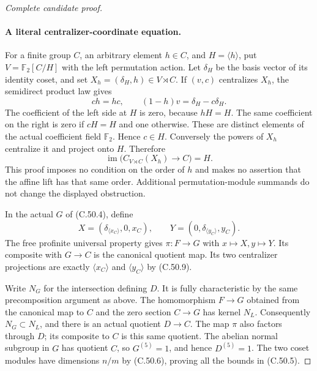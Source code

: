 \begin{proof}[Complete candidate proof]
\paragraph{A literal centralizer-coordinate equation.}
For a finite group $C$, an arbitrary element $h\in C$, and
$H=\langle h\rangle$, put $V=\mathbb F_2[C/H]$ with the
left permutation action. Let $\delta_H$ be the basis vector of
its identity coset, and set $X_h=(\delta_H,h)\in V\rtimes C$.
If $(v,c)$ centralizes $X_h$, the semidirect product law gives
\[
      ch=hc,\qquad (1-h)v=\delta_H-c\delta_H.          \tag{C.50.8}
\]
The coefficient of the left side at $H$ is zero, because $hH=H$.
The same coefficient on the right is zero if $cH=H$ and one
otherwise. These are distinct elements of the actual coefficient
field $\mathbb F_2$. Hence $c\in H$. Conversely the powers of
$X_h$ centralize it and project onto $H$. Therefore
\[
       \operatorname{im}\bigl(C_{V\rtimes C}(X_h)\to C\bigr)=H.
                                                               \tag{C.50.9}
\]
This proof imposes no condition on the order of $h$ and makes no
assertion that the affine lift has that same order. Additional
permutation-module summands do not change the displayed obstruction.

In the actual $G$ of (C.50.4), define
\[
 X=(\delta_{\langle x_C\rangle},0,x_C),\qquad
 Y=(0,\delta_{\langle y_C\rangle},y_C).
                                                               \tag{C.50.10}
\]
The free profinite universal property gives $\pi:F\to G$ with
$x\mapsto X,y\mapsto Y$. Its composite with $G\to C$ is the
canonical quotient map. Its two centralizer projections are exactly
$\langle x_C\rangle$ and $\langle y_C\rangle$ by (C.50.9).

Write $N_G$ for the intersection defining $D$. It is fully
characteristic by the same precomposition argument as above.
The homomorphism $F\to G$ obtained from the canonical map to $C$
and the zero section $C\to G$ has kernel $N_L$. Consequently
$N_G\subset N_L$, and there is an actual quotient $D\to C$.
The map $\pi$ also factors through $D$; its composite to $C$ is
this same quotient. The abelian normal subgroup in $G$ has
quotient $C$, so $G^{(5)}=1$, and hence $D^{(5)}=1$.
The two coset modules have dimensions $n/m$ by (C.50.6), proving
all the bounds in (C.50.5).


\end{proof}
